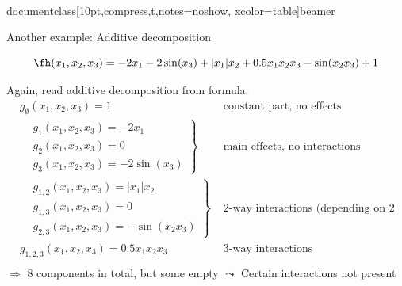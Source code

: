 \\documentclass[10pt,compress,t,notes=noshow, xcolor=table]{beamer}
\begin{document}
\begin{frame}{Another example: Additive decomposition}

    \begin{example}


        $$
        \fh(x_1, x_2, x_3) = - 2x_1 - 2\sin(x_3) + |x_1|x_2 + 0.5 x_1 x_2 x_3 - \sin(x_2 x_3) + 1
        $$

        Again, read additive decomposition from formula:
        \pause
        \begin{equation}\label{eq:func_decomp_second_min_example}
        \begin{aligned}
            & g_\emptyset(x_1, x_2, x_3) = 1 & \text{ constant part, no effects}  \\
            &
            \left.\begin{aligned}
                & g_1(x_1, x_2, x_3) = - 2x_1 \\
                & g_2(x_1, x_2, x_3) = 0 \\
                & g_3(x_1, x_2, x_3) = - 2\sin(x_3)
            \end{aligned}\right\}
                & \text{ main effects, no interactions}  \\
            &
            \left.\begin{aligned}
                & g_{1,2}(x_1, x_2, x_3) = |x_1|x_2 \\
                & g_{1,3}(x_1, x_2, x_3) = 0 \\
                & g_{2,3}(x_1, x_2, x_3) = - \sin(x_2 x_3)
            \end{aligned}\right\}
                & \text{ 2-way interactions (depending on 2 features)}  \\
            & g_{1,2,3}(x_1, x_2, x_3) = 0.5 x_1 x_2 x_3 & \text{ 3-way interactions}  \\
        \end{aligned}
        \end{equation}
        \(\Rightarrow\) 8 components in total, but some empty $\leadsto$ Certain interactions not present
        
    \end{example}
    
\end{frame}
\end{document}

